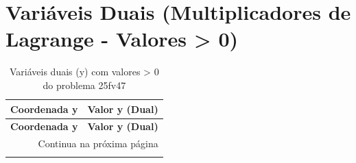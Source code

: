 \documentclass[12pt]{article}
\begin{document}
\section{Variáveis Duais (Multiplicadores de Lagrange - Valores > 0)}

\begin{longtable}{@{}cc@{}}
\caption{Variáveis duais (y) com valores > 0 do problema 25fv47} \\
\toprule
\textbf{Coordenada y} & \textbf{Valor y (Dual)} \\
\midrule
\endfirsthead

\toprule
\textbf{Coordenada y} & \textbf{Valor y (Dual)} \\
\midrule
\endhead

\midrule \multicolumn{2}{r}{{Continua na próxima página}} \\ \midrule
\endfoot


\end{longtable}
\end{document}

